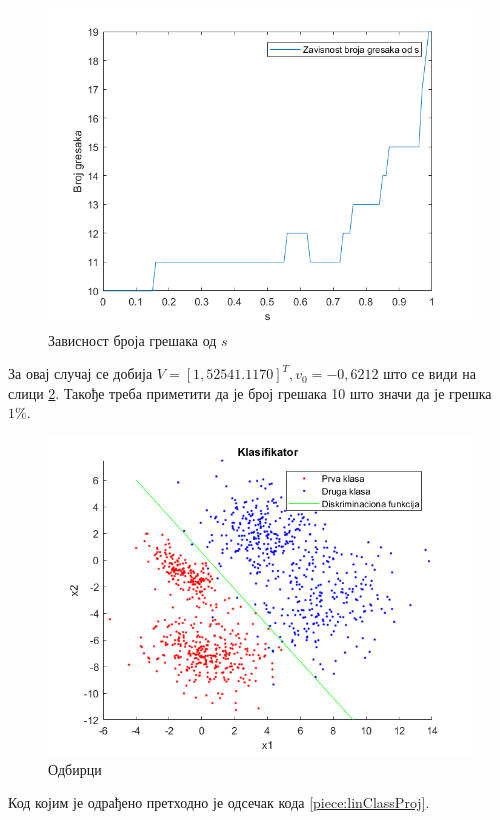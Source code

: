\begin{figure}[htb!]
\includegraphics[scale=.6]{pictures/3/sDep}
\centering
\caption{Зависност броја грешака од $s$}\label{fig:sDep}
\end{figure}
За овај случај се добија $V =[1,5254 1.1170]^T, v_0 = -0,6212$ што се види на слици \ref{fig:linClassDisc}. Такође треба приметити да је број грешака 10 што значи да је грешка $1\%$.

\begin{figure}[htb!]
\includegraphics[scale=.6]{pictures/3/LinClassDisc}
\centering
\caption{Одбирци}\label{fig:linClassDisc}
\end{figure}

Код којим је одрађено претходно је одсечак кода \ref{piece:linClassProj}.

